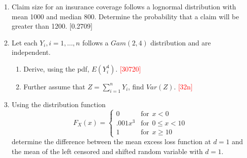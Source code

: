 \documentclass[11pt]{article}
\begin{document}
\begin{enumerate}
	\item Claim size for an insurance coverage follows a lognormal distribution with mean 1000 and median 800. Determine the probability that a claim will be greater than 1200. [0.2709]
	\item Let each $Y_i, i=1,\ldots,n$ follows a $Gam(2,4)$ distribution and are independent. 
		\begin{enumerate}
			\item Derive, using the pdf, $E(Y_i^4)$. \textcolor{red}{[30720]}
			\item Further assume that $Z=\sum_{i=1}^n Y_i$, find $Var(Z)$. \textcolor{red}{[32n]}
		\end{enumerate}



\item Using the distribution function \[F_X(x) = \begin{cases} 0 & \mbox{for} ~~ x < 0 \\ .001 x^3 & \mbox{for} ~~ 0 \leq x < 10 \\ 1 & \mbox{for}~~ x \geq 10 \end{cases}\] determine the difference between the mean excess loss function at $d=1$ and the mean of the left censored and shifted random variable with $d=1$.  

\end{enumerate}
\end{document}
